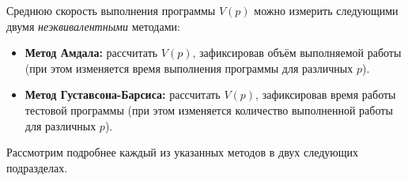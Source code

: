 Среднюю скорость выполнения программы $V(p)$ можно измерить следующими двумя \textit{неэквивалентными} методами:

\begin{itemize}
    \item\textbf{Метод Амдала:} рассчитать $V(p)$, зафиксировав объём выполняемой работы (при этом изменяется время выполнения программы для различных $p$).
    \item\textbf{Метод Густавсона-Барсиса:} рассчитать $V(p)$, зафиксировав время работы тестовой программы (при этом изменяется количество выполненной работы для различных $p$).
\end{itemize}

Рассмотрим подробнее каждый из указанных методов в двух следующих подразделах.
